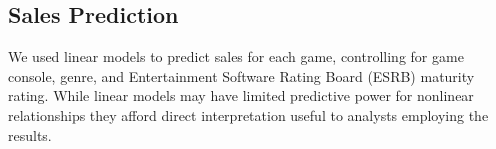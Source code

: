 \documentclass{sig-alternate}
\begin{document}








\subsection{Sales Prediction}
We used linear models to predict sales for each game, controlling for game console, genre, and Entertainment Software Rating Board (ESRB) maturity rating. While linear models may have limited predictive power for nonlinear relationships they afford direct interpretation useful to analysts employing the results. 
\end{document}
